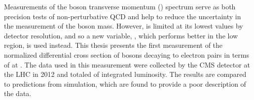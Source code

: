 
Measurements of the \Z boson transverse momentum (\bosonpt) spectrum serve as
both precision tests of non-perturbative QCD and help to reduce the uncertainty
in the measurement of the \W boson mass. However, \bosonpt is
limited at its lowest values by detector resolution, and so a new variable,
\phistar, which performs better in the low \bosonpt region, is used instead.
This thesis presents the first measurement of the normalized differential cross
section of \Z bosons decaying to electron pairs in terms of \phistar at
\rootseight. The data used in this measurement were collected by the CMS
detector at the LHC in 2012 and totaled \GoodLumiNumber of integrated
luminosity. The results are compared to predictions from simulation, which are
found to provide a poor description of the data.
